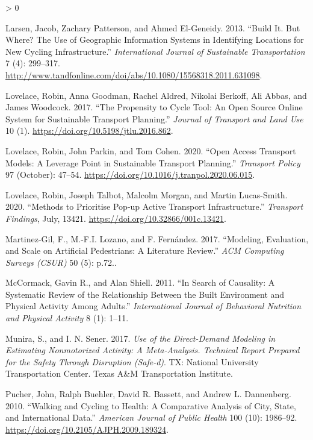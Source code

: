 \documentclass[galley]{jtlu-article-2col}
\newlength{\cslhangindent}
\newenvironment{CSLReferences}[2] %
 {%
  \setlength{\parindent}{0pt}
  \ifodd #1 \everypar{\setlength{\hangindent}{\cslhangindent}}\ignorespaces\fi
  \ifnum #2 > 0
  \setlength{\parskip}{#2\baselineskip}
  \fi
 }%
 {}
\begin{document}
\begin{CSLReferences}{1}{0}
\leavevmode\hypertarget{ref-larsen_build_2013}{}%
Larsen, Jacob, Zachary Patterson, and Ahmed El-Geneidy. 2013. {``Build It. {But} Where? {The} Use of Geographic Information Systems in Identifying Locations for New Cycling Infrastructure.''} \emph{International Journal of Sustainable Transportation} 7 (4): 299--317. \url{http://www.tandfonline.com/doi/abs/10.1080/15568318.2011.631098}.

\leavevmode\hypertarget{ref-lovelace_propensity_2017}{}%
Lovelace, Robin, Anna Goodman, Rachel Aldred, Nikolai Berkoff, Ali Abbas, and James Woodcock. 2017. {``The {Propensity} to {Cycle Tool}: {An} Open Source Online System for Sustainable Transport Planning.''} \emph{Journal of Transport and Land Use} 10 (1). \url{https://doi.org/10.5198/jtlu.2016.862}.

\leavevmode\hypertarget{ref-lovelace_open_2020}{}%
Lovelace, Robin, John Parkin, and Tom Cohen. 2020. {``Open Access Transport Models: {A} Leverage Point in Sustainable Transport Planning.''} \emph{Transport Policy} 97 (October): 47--54. \url{https://doi.org/10.1016/j.tranpol.2020.06.015}.

\leavevmode\hypertarget{ref-lovelace_methods_2020}{}%
Lovelace, Robin, Joseph Talbot, Malcolm Morgan, and Martin Lucas-Smith. 2020. {``Methods to {Prioritise Pop}-up {Active Transport Infrastructure}.''} \emph{Transport Findings}, July, 13421. \url{https://doi.org/10.32866/001c.13421}.

\leavevmode\hypertarget{ref-martinez-gil_modeling_2017}{}%
Martinez-Gil, F., M.-F.I. Lozano, and F. Fernández. 2017. {``Modeling, Evaluation, and Scale on Artificial Pedestrians: A Literature Review.''} \emph{ACM Computing Surveys (CSUR)} 50 (5): p.72..

\leavevmode\hypertarget{ref-mccormack_search_2011}{}%
McCormack, Gavin R., and Alan Shiell. 2011. {``In Search of Causality: A Systematic Review of the Relationship Between the Built Environment and Physical Activity Among Adults.''} \emph{International Journal of Behavioral Nutrition and Physical Activity} 8 (1): 1--11.

\leavevmode\hypertarget{ref-munira_use_2017}{}%
Munira, S., and I. N. Sener. 2017. \emph{Use of the Direct-Demand Modeling in Estimating Nonmotorized Activity: {A} Meta-Analysis. {Technical} Report Prepared for the Safety Through Disruption (Safe-d)}. {TX: National University Transportation Center. Texas A\&M Transportation Institute}.

\leavevmode\hypertarget{ref-pucher_walking_2010}{}%
Pucher, John, Ralph Buehler, David R. Bassett, and Andrew L. Dannenberg. 2010. {``Walking and Cycling to Health: {A} Comparative Analysis of City, State, and International Data.''} \emph{American Journal of Public Health} 100 (10): 1986--92. \url{https://doi.org/10.2105/AJPH.2009.189324}.


\end{CSLReferences}
\end{document}
